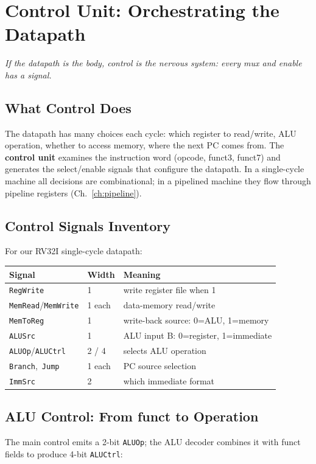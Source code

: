 \chapter{Control Unit: Orchestrating the Datapath}\label{ch:control}
\begin{center}\small\textit{If the datapath is the body, control is the nervous system: every mux and enable has a signal.}\end{center}

\section{What Control Does}
The datapath has many choices each cycle: which register to read/write, ALU operation, whether to access memory, where the next PC comes from.
The \textbf{control unit} examines the instruction word (opcode, funct3, funct7) and generates the select/enable signals that configure the datapath.
In a single-cycle machine all decisions are combinational; in a pipelined machine they flow through pipeline registers (Ch.~\ref{ch:pipeline}).

\section{Control Signals Inventory}
For our RV32I single-cycle datapath:

\begin{center}
\begin{tabular}{lll}
\toprule Signal & Width & Meaning \\ \midrule
\texttt{RegWrite} & 1 & write register file when 1 \\
\texttt{MemRead}/\texttt{MemWrite} & 1 each & data-memory read/write \\
\texttt{MemToReg} & 1 & write-back source: 0=ALU, 1=memory \\
\texttt{ALUSrc} & 1 & ALU input B: 0=register, 1=immediate \\
\texttt{ALUOp}/\texttt{ALUCtrl} & 2 / 4 & selects ALU operation \\
\texttt{Branch},\ \texttt{Jump} & 1 each & PC source selection \\
\texttt{ImmSrc} & 2 & which immediate format \\ \bottomrule
\end{tabular}
\end{center}

\section{ALU Control: From funct to Operation}
The main control emits a 2-bit \texttt{ALUOp}; the ALU decoder combines it with funct fields to produce 4-bit \texttt{ALUCtrl}:

